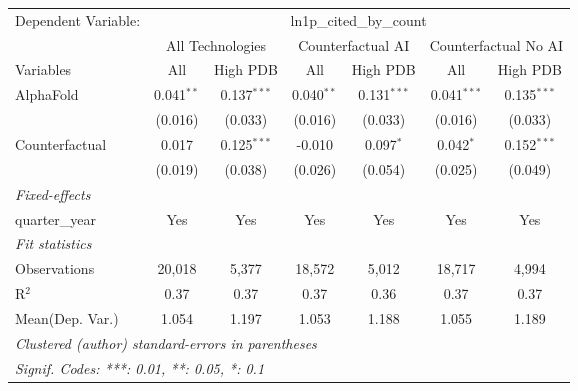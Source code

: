 \begingroup
\centering
\begin{tabular}{lcccccc}
   \tabularnewline \midrule \midrule
   Dependent Variable: & \multicolumn{6}{c}{ln1p\_cited\_by\_count}\\
 & \multicolumn{2}{c}{All Technologies} & \multicolumn{2}{c}{Counterfactual AI} & \multicolumn{2}{c}{Counterfactual No AI} \\
\cmidrule(lr){1-1}\cmidrule(lr){2-3} \cmidrule(lr){4-5} \cmidrule(lr){6-7}
Variables & \multicolumn{1}{c}{All} & \multicolumn{1}{c}{High PDB} & \multicolumn{1}{c}{All} & \multicolumn{1}{c}{High PDB} & \multicolumn{1}{c}{All} & \multicolumn{1}{c}{High PDB} \\
\cmidrule(lr){1-1}\cmidrule(lr){2-2} \cmidrule(lr){3-3} \cmidrule(lr){4-4} \cmidrule(lr){5-5} \cmidrule(lr){6-6} \cmidrule(lr){7-7}
   AlphaFold      & 0.041$^{**}$ & 0.137$^{***}$ & 0.040$^{**}$ & 0.131$^{***}$ & 0.041$^{***}$ & 0.135$^{***}$\\   
                  & (0.016)      & (0.033)       & (0.016)      & (0.033)       & (0.016)       & (0.033)\\   
   Counterfactual & 0.017        & 0.125$^{***}$ & -0.010       & 0.097$^{*}$   & 0.042$^{*}$   & 0.152$^{***}$\\   
                  & (0.019)      & (0.038)       & (0.026)      & (0.054)       & (0.025)       & (0.049)\\   
   \midrule
   \emph{Fixed-effects}\\
   quarter\_year  & Yes          & Yes           & Yes          & Yes           & Yes           & Yes\\  
   \midrule
   \emph{Fit statistics}\\
   Observations   & 20,018       & 5,377         & 18,572       & 5,012         & 18,717        & 4,994\\  
   R$^2$          & 0.37         & 0.37          & 0.37         & 0.36          & 0.37          & 0.37\\  
Mean(Dep. Var.) & 1.054 & 1.197 & 1.053 & 1.188 & 1.055 & 1.189 \\
   \midrule \midrule
   \multicolumn{7}{l}{\emph{Clustered (author) standard-errors in parentheses}}\\
   \multicolumn{7}{l}{\emph{Signif. Codes: ***: 0.01, **: 0.05, *: 0.1}}\\
\end{tabular}
\par\endgroup
